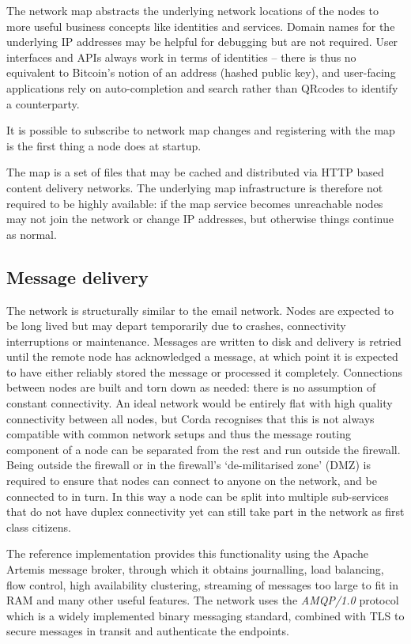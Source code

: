 \documentclass{article}
\begin{document}
The network map abstracts the underlying network locations of the nodes to more useful business concepts like
identities and services. Domain names for the underlying IP addresses may be helpful for debugging but are not
required. User interfaces and APIs always work in terms of identities -- there is thus no equivalent to Bitcoin's
notion of an address (hashed public key), and user-facing applications rely on auto-completion and search rather
than QRcodes to identify a counterparty.

It is possible to subscribe to network map changes and registering with the map is the first thing a node does at
startup.

The map is a set of files that may be cached and distributed via HTTP based content delivery networks. The
underlying map infrastructure is therefore not required to be highly available: if the map service becomes
unreachable nodes may not join the network or change IP addresses, but otherwise things continue as normal.

\subsection{Message delivery}

The network is structurally similar to the email network. Nodes are expected to be long lived but may depart
temporarily due to crashes, connectivity interruptions or maintenance. Messages are written to disk and delivery is
retried until the remote node has acknowledged a message, at which point it is expected to have either reliably
stored the message or processed it completely. Connections between nodes are built and torn down as needed: there
is no assumption of constant connectivity. An ideal network would be entirely flat with high quality connectivity
between all nodes, but Corda recognises that this is not always compatible with common network setups and thus the
message routing component of a node can be separated from the rest and run outside the firewall. Being outside the
firewall or in the firewall's `de-militarised zone' (DMZ) is required to ensure that nodes can connect to anyone on
the network, and be connected to in turn. In this way a node can be split into multiple sub-services that do not
have duplex connectivity yet can still take part in the network as first class citizens.

The reference implementation provides this functionality using the Apache Artemis message broker, through which it
obtains journalling, load balancing, flow control, high availability clustering, streaming of messages too large to
fit in RAM and many other useful features. The network uses the \emph{AMQP/1.0}\cite{AMQP} protocol which is a
widely implemented binary messaging standard, combined with TLS to secure messages in transit and authenticate the
endpoints.
\end{document}
